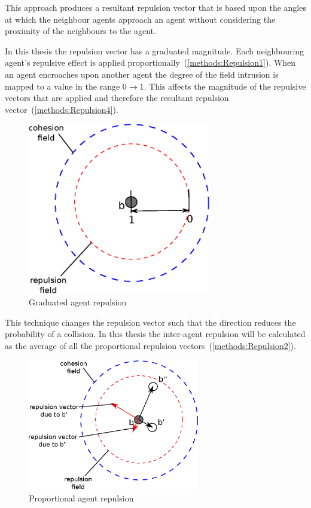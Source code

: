 This approach produces a resultant repulsion vector that is based upon the angles at which the neighbour agents approach an agent without considering the proximity of the neighbours to the agent. 

In this thesis the repulsion vector has a graduated magnitude. Each neighbouring agent's repulsive effect is applied proportionally~(\autoref{methods:Repulsion1}). When an agent encroaches upon another agent the degree of the field intrusion is mapped to a value in the range $0 \rightarrow 1$. This affects the magnitude of the repulsive vectors that are applied and therefore the resultant repulsion vector~(\autoref{methods:Repulsion4}). 

\begin{figure}[H]
\begin{center}
\includegraphics[width=8cm]{CHAPTER-2/figures/Repulsion1}
\caption{Graduated agent repulsion \label{methods:Repulsion1}}
\end{center}
\end{figure}

This technique changes the repulsion vector such that the direction reduces the probability of a collision. In this thesis the inter-agent repulsion will be calculated as the average of all the proportional repulsion vectors~(\autoref{methods:Repulsion2}). 
 
\begin{figure}[H]
\begin{center}
\includegraphics[width=7.5cm]{CHAPTER-2/figures/Repulsion2}
\caption{Proportional agent repulsion \label{methods:Repulsion2}}
\end{center}
\end{figure}

